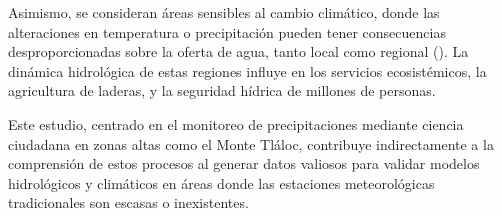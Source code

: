 Asimismo, se consideran áreas sensibles al cambio climático, donde las alteraciones en temperatura o precipitación pueden tener consecuencias desproporcionadas sobre la oferta de agua, tanto local como regional  (\cite{beniston2003climatic}). La dinámica hidrológica de estas regiones influye en los servicios ecosistémicos, la agricultura de laderas, y la seguridad hídrica de millones de personas.

Este estudio, centrado en el monitoreo de precipitaciones mediante ciencia ciudadana en zonas altas como el Monte Tláloc, contribuye indirectamente a la comprensión de estos procesos al generar datos valiosos para validar modelos hidrológicos y climáticos en áreas donde las estaciones meteorológicas tradicionales son escasas o inexistentes.



